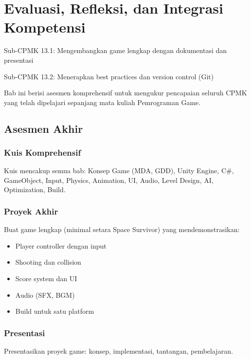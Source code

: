 \documentclass[../main]{subfiles}
\begin{document}
\chapter{Evaluasi, Refleksi, dan Integrasi Kompetensi}

\begin{subcpmk}
  \item Sub-CPMK 13.1: Mengembangkan game lengkap dengan dokumentasi dan presentasi
  \item Sub-CPMK 13.2: Menerapkan best practices dan version control (Git)
\end{subcpmk}

Bab ini berisi asesmen komprehensif untuk mengukur pencapaian seluruh CPMK yang telah dipelajari sepanjang mata kuliah Pemrograman Game.

\section{Asesmen Akhir}

\subsection{Kuis Komprehensif}

Kuis mencakup semua bab: Konsep Game (MDA, GDD), Unity Engine, C\#, GameObject, Input, Physics, Animation, UI, Audio, Level Design, AI, Optimization, Build.

\subsection{Proyek Akhir}

Buat game lengkap (minimal setara Space Survivor) yang mendemonstrasikan:
\begin{itemize}
\item Player controller dengan input
\item Shooting dan collision
\item Score system dan UI
\item Audio (SFX, BGM)
\item Build untuk satu platform
\end{itemize}

\subsection{Presentasi}

Presentasikan proyek game: konsep, implementasi, tantangan, pembelajaran.
\end{document}
